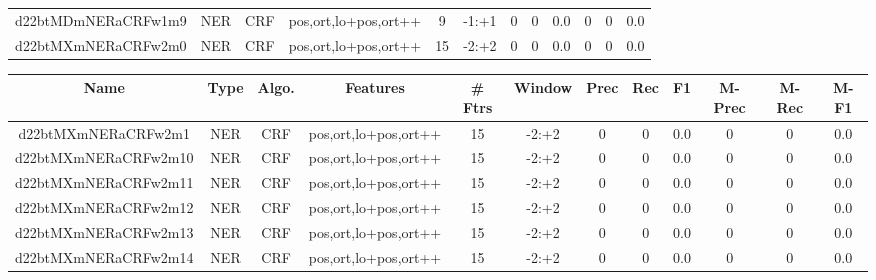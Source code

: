 \documentclass[a4paper]{article}
\begin{document}
\begin{landscape}
\begin{center}
\begin{tabular}{ |c|c|c|c|c|c|c|c|c|c|c|c|}
 
 	
 	\small{ d22btMDmNERaCRFw1m9 } & \small{ NER} & \small{  CRF }  & pos,ort,lo+pos,ort++  &  9 &  \small{  -1:+1 }  &  0 & 0 & 0.0  &  0 & 0 & 0.0 \\
 	

 
 	
 	\small{ d22btMXmNERaCRFw2m0 } & \small{ NER} & \small{  CRF }  & pos,ort,lo+pos,ort++  &  15 &  \small{  -2:+2 }  &  0 & 0 & 0.0  &  0 & 0 & 0.0 \\
 	
 \hline
\end{tabular}
\end{center}




\begin{center}
\begin{tabular}{ |c|c|c|c|c|c|c|c|c|c|c|c|} 
 \hline
 	Name & Type & Algo. & Features & \# Ftrs & Window & Prec & Rec & F1 & M-Prec & M-Rec & M-F1\\
 \hline

 	

 
 	
 	\small{ d22btMXmNERaCRFw2m1 } & \small{ NER} & \small{  CRF }  & pos,ort,lo+pos,ort++  &  15 &  \small{  -2:+2 }  &  0 & 0 & 0.0  &  0 & 0 & 0.0 \\
 	

 
 	
 	\small{ d22btMXmNERaCRFw2m10 } & \small{ NER} & \small{  CRF }  & pos,ort,lo+pos,ort++  &  15 &  \small{  -2:+2 }  &  0 & 0 & 0.0  &  0 & 0 & 0.0 \\
 	

 
 	
 	\small{ d22btMXmNERaCRFw2m11 } & \small{ NER} & \small{  CRF }  & pos,ort,lo+pos,ort++  &  15 &  \small{  -2:+2 }  &  0 & 0 & 0.0  &  0 & 0 & 0.0 \\
 	

 
 	
 	\small{ d22btMXmNERaCRFw2m12 } & \small{ NER} & \small{  CRF }  & pos,ort,lo+pos,ort++  &  15 &  \small{  -2:+2 }  &  0 & 0 & 0.0  &  0 & 0 & 0.0 \\
 	

 
 	
 	\small{ d22btMXmNERaCRFw2m13 } & \small{ NER} & \small{  CRF }  & pos,ort,lo+pos,ort++  &  15 &  \small{  -2:+2 }  &  0 & 0 & 0.0  &  0 & 0 & 0.0 \\
 	

 
 	
 	\small{ d22btMXmNERaCRFw2m14 } & \small{ NER} & \small{  CRF }  & pos,ort,lo+pos,ort++  &  15 &  \small{  -2:+2 }  &  0 & 0 & 0.0  &  0 & 0 & 0.0 \\
 	


\end{tabular}
\end{center}
\end{landscape}
\end{document}
